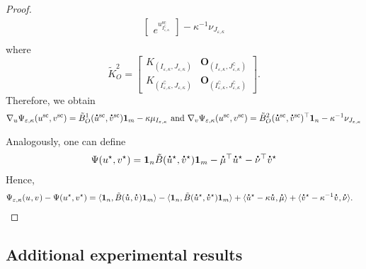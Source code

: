 \begin{proof}
\begin{align*}
\begin{bmatrix}
e^{u^{\text{sc}}_{I^\complement_{\varepsilon,\kappa}}}
\end{bmatrix}
- \kappa^{-1} \nu_{J_{\varepsilon,\kappa}}\\
\end{align*}
where 
\begin{equation*}
\tilde{K}^2_O = 
\begin{bmatrix}
K_{(I_{\varepsilon,\kappa}, J_{\varepsilon,\kappa})} &\mathbf O_{(I_{\varepsilon,\kappa}, J^\complement_{\varepsilon,\kappa})}\\
K_{(I^\complement_{\varepsilon,\kappa}, J_{\varepsilon,\kappa})} &\mathbf O_{(I^\complement_{\varepsilon,\kappa}, J^\complement_{\varepsilon,\kappa})}
\end{bmatrix}.
\end{equation*}
Therefore, we obtain 
\begin{equation*}
\nabla_u \Psi_{\varepsilon, \kappa}(u^{\text{sc}},v^{\text{sc}}) = \tilde{B}^1_O(\dt{u}^{\text{sc}},\dt{v}^{\text{sc}}) \mathbf 1_m - \kappa \mu_{I_{\varepsilon,\kappa}} \text{ and } \nabla_v \Psi_{\varepsilon, \kappa}(u^{\text{sc}},v^{\text{sc}}) = \tilde{B}^2_O(\dt{u}^{\text{sc}},\dt{v}^{\text{sc}})^\top \mathbf 1_n- \kappa^{-1} \nu_{J_{\varepsilon,\kappa}}
\end{equation*}

Analogously, one can define 
\begin{align*}
\Psi(u^\star, v^\star) = \mathbf{1}_n \tilde{B}(\dt{u}^\star, \dt{v}^\star) \mathbf{1}_m - \dt{\mu}^\top \dt{u}^\star - \dt{\nu}^\top \dt{v}^\star
\end{align*}
Hence,
\begin{align*} 
 \Psi_{\varepsilon, \kappa} (u^{\text{}} ,v^{\text{}}) -\Psi(u^\star, v^\star)
& = \inr{\mathbf 1_n, \tilde{B}(\dt{u}^{\text{}} ,\dt{v}^{\text{}})\mathbf 1_m} - \inr{\mathbf{1}_n, \tilde{B}(\dt{u}^{\star} ,\dt{v}^{\star})\mathbf 1_m} + \inr{\dt{u}^{\star} - \kappa \dt{u}^{\text{}}, \dt{\mu}} + \inr{\dt{v}^{\star} - \kappa^{-1}\dt{v}^{\text{}}, \dt{\nu}}.
\end{align*}
\end{proof}

\subsection{Additional experimental results}